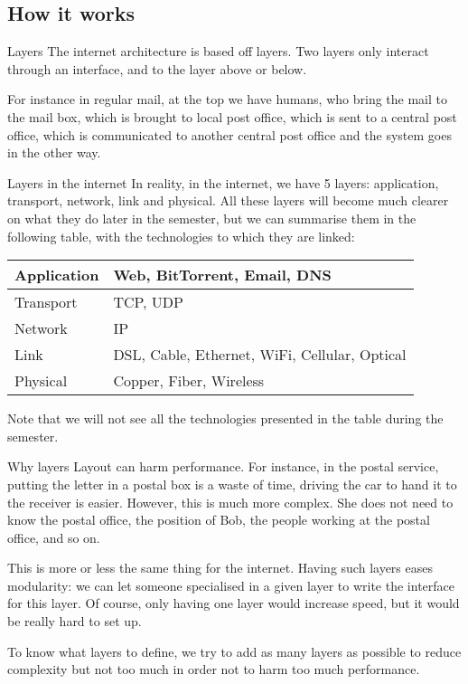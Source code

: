 \documentclass[a4paper]{article}
\begin{document}
\subsection{How it works}
\begin{parag}{Layers}
    The internet architecture is based off layers. Two layers only interact through an interface, and to the layer above or below. 

    For instance in regular mail, at the top we have humans, who bring the mail to the mail box, which is brought to local post office, which is sent to a central post office, which is communicated to another central post office and the system goes in the other way.
\end{parag}

\begin{parag}{Layers in the internet}
    In reality, in the internet, we have 5 layers: application, transport, network, link and physical. All these layers will become much clearer on what they do later in the semester, but we can summarise them in the following table, with the technologies to which they are linked:
    \begin{center}
    \begin{tabular}{|l|l|}
        \hline
        Application & Web, BitTorrent, Email, DNS \\
        \hline
        Transport & TCP, UDP \\
        \hline
        Network & IP \\
        \hline
        Link & DSL, Cable, Ethernet, WiFi, Cellular, Optical \\
        \hline
        Physical & Copper, Fiber, Wireless \\
        \hline
    \end{tabular}
    \end{center}

    Note that we will not see all the technologies presented in the table during the semester.
    
    \begin{subparag}{Why layers}
        Layout can harm performance. For instance, in the postal service, putting the letter in a postal box is a waste of time, driving the car to hand it to the receiver is easier. However, this is much more complex. She does not need to know the postal office, the position of Bob, the people working at the postal office, and so on.

        This is more or less the same thing for the internet. Having such layers eases modularity: we can let someone specialised in a given layer to write the interface for this layer. Of course, only having one layer would increase speed, but it would be really hard to set up. 

        To know what layers to define, we try to add as many layers as possible to reduce complexity but not too much in order not to harm too much performance.
    \end{subparag}
\end{parag}
\end{document}

